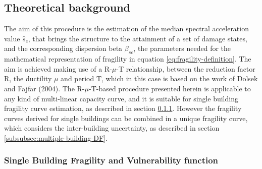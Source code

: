 \subsection{Theoretical background}
The aim of this procedure is the estimation of the median spectral acceleration value $\hat{s}_c$, that brings the structure to the attainment of a set of damage states, and the corresponding dispersion beta $\beta_{sc}$, the parameters needed for the mathematical representation of fragility in equation \ref{eq:fragility-definition}. The aim is achieved making use of a R-$\mu$-T relationship, between the reduction factor R, the ductility $\mu$ and period T, which in this case is based on the work of Dolsek and Fajfar (2004).
The R-$\mu$-T-based procedure presented herein is applicable to any kind of multi-linear capacity curve, and it is suitable for single building fragility curve estimation, as described in section \ref{subsubsec:single-building-DF}. However the fragility curves derived for single buildings can be combined in a unique fragility curve, which considers the inter-building uncertainty, as described in section \ref{subsubsec:multiple-building-DF}.

\subsubsection{Single Building Fragility and Vulnerability function}
\label{subsubsec:single-building-DF}
